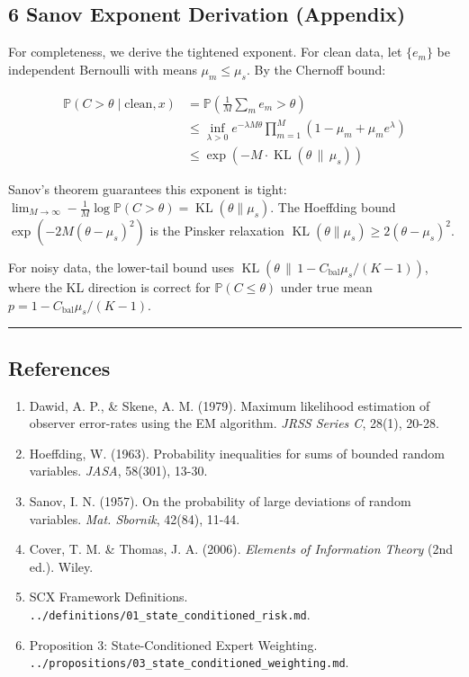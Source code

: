 \documentclass[
  12pt,
]{ctexart}
\providecommand{\tightlist}{%
  \setlength{\itemsep}{0pt}\setlength{\parskip}{0pt}}
\begin{document}
\subsection{6 Sanov Exponent Derivation
(Appendix)}\label{sanov-exponent-derivation-appendix}

For completeness, we derive the tightened exponent. For clean data, let
\(\{e_m\}\) be independent Bernoulli with means \(\mu_m \leq \mu_s\). By
the Chernoff bound:

\[\begin{aligned}
\mathbb{P}(C > \theta \mid \text{clean}, x) 
&= \mathbb{P}\!\left(\frac{1}{M}\sum_m e_m > \theta\right) \\
&\leq \inf_{\lambda > 0} e^{-\lambda M\theta} \prod_{m=1}^M (1 - \mu_m + \mu_m e^\lambda) \\
&\leq \exp\!\left(-M \cdot \operatorname{KL}(\theta \,\|\, \mu_s)\right)
\end{aligned}\]

Sanov's theorem guarantees this exponent is tight:
\(\lim_{M\to\infty} -\frac{1}{M}\log \mathbb{P}(C > \theta) = \operatorname{KL}(\theta \|\mu_s)\).
The Hoeffding bound \(\exp(-2M(\theta-\mu_s)^2)\) is the Pinsker
relaxation \(\operatorname{KL}(\theta \|\mu_s) \geq 2(\theta-\mu_s)^2\).

For noisy data, the lower-tail bound uses
\(\operatorname{KL}(\theta \,\|\, 1 - C_{\text{bal}}\mu_s/(K-1))\),
where the KL direction is correct for \(\mathbb{P}(C \leq \theta)\)
under true mean \(p = 1 - C_{\text{bal}}\mu_s/(K-1)\).

\begin{center}\rule{0.5\linewidth}{0.5pt}\end{center}

\subsection{References}\label{references}

\begin{enumerate}
\def\labelenumi{\arabic{enumi}.}
\tightlist
\item
  Dawid, A. P., \& Skene, A. M. (1979). Maximum likelihood estimation of
  observer error-rates using the EM algorithm. \emph{JRSS Series C},
  28(1), 20-28.
\item
  Hoeffding, W. (1963). Probability inequalities for sums of bounded
  random variables. \emph{JASA}, 58(301), 13-30.
\item
  Sanov, I. N. (1957). On the probability of large deviations of random
  variables. \emph{Mat. Sbornik}, 42(84), 11-44.
\item
  Cover, T. M. \& Thomas, J. A. (2006). \emph{Elements of Information
  Theory} (2nd ed.). Wiley.
\item
  SCX Framework Definitions.
  \texttt{../definitions/01\_state\_conditioned\_risk.md}.
\item
  Proposition 3: State-Conditioned Expert Weighting.
  \texttt{../propositions/03\_state\_conditioned\_weighting.md}.
\end{enumerate}
\end{document}
